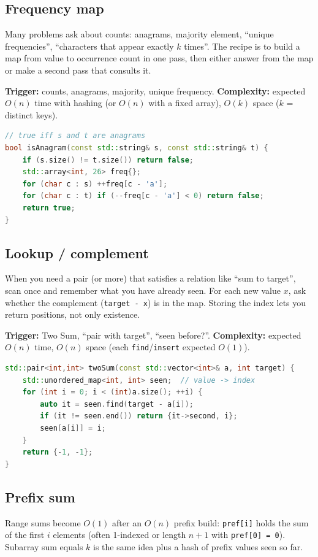 \subsection{Frequency map}
\label{subsec:pat-freq-map}
Many problems ask about counts: anagrams, majority element, ``unique frequencies'',
``characters that appear exactly $k$ times''. The recipe is to build a map from
value to occurrence count in one pass, then either answer from the map or make a
second pass that consults it.

\textbf{Trigger:} counts, anagrams, majority, unique frequency.
\newline
\textbf{Complexity:} expected $O(n)$ time with hashing (or $O(n)$ with a fixed array),
$O(k)$ space ($k$ = distinct keys).

\begin{lstlisting}[language=C++]
// true iff s and t are anagrams
bool isAnagram(const std::string& s, const std::string& t) {
    if (s.size() != t.size()) return false;
    std::array<int, 26> freq{};
    for (char c : s) ++freq[c - 'a'];
    for (char c : t) if (--freq[c - 'a'] < 0) return false;
    return true;
}
\end{lstlisting}

\subsection{Lookup / complement}
\label{subsec:pat-lookup-complement}
When you need a pair (or more) that satisfies a relation like ``sum to target'',
scan once and remember what you have already seen. For each new value $x$, ask
whether the complement (\texttt{target - x}) is in the map. Storing the index
lets you return positions, not only existence.

\textbf{Trigger:} Two Sum, ``pair with target'', ``seen before?''.
\newline
\textbf{Complexity:} expected $O(n)$ time, $O(n)$ space
(each \texttt{find}/\texttt{insert} expected $O(1)$).

\begin{lstlisting}[language=C++]
std::pair<int,int> twoSum(const std::vector<int>& a, int target) {
    std::unordered_map<int, int> seen;  // value -> index
    for (int i = 0; i < (int)a.size(); ++i) {
        auto it = seen.find(target - a[i]);
        if (it != seen.end()) return {it->second, i};
        seen[a[i]] = i;
    }
    return {-1, -1};
}
\end{lstlisting}

\subsection{Prefix sum}
\label{subsec:pat-prefix-sum}
Range sums become $O(1)$ after an $O(n)$ prefix build:
\texttt{pref[i]} holds the sum of the first $i$ elements (often 1-indexed or
length $n{+}1$ with \texttt{pref[0] = 0}). Subarray sum equals $k$ is the same
idea plus a hash of prefix values seen so far.

